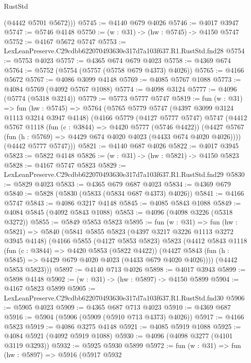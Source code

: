 \begin{lexlean}{RustStd}
\begin{coremodule}
        (@4442 @5701 @5672)))
@5745 := @4140 @679 @4026
@5746 := @4017 @3947
@5747 := @5746 @4148
@5750 := (w : @31) -> (hw : @5745) -> @4150 @5747
@5752 := @4167 @5672 @5747
@5753 := LexLeanPreserve.C29cdbb622070493630e317d7a103f637.R1.RustStd.fnd28
@5754 := @5753 @4023
@5757 := @4365 @674 @679 @4023
@5758 := @4369 @674
@5764 := @5752 (@5754 (@5757 (@5758 @679 @4373) @4026))
@5765 := @4166 @5672
@5767 := @4086 @3099 @4148
@5769 := @4085 @5767 @1088
@5773 := @4084 @5769 (@4092 @5767 @1088)
@5774 := @4098 @3124
@5777 := @4096 (@5774 (@5318 @3214))
@5779 := @5773 @5777 @5747
@5819 := fun (w : @31) =>
  fun (hw : @5745) =>
  @5764
    (@5765
      @5779
      @5747
      (@4397 @3099 @3124 @1113 @3214 @3947 @4148)
      (@4166
        @5779
        (@4127 @5777 @5747)
        @5747
        (@4412
          @5767
          @1118
          (fun (c : @3844) => @4420 @5777 (@5746 @4422))
          (@4427 @5767 (fun (h : @5769) => @4429 @674 @4020 @4023 (@4433 @674 @4020 @4026))))
        (@4442 @5777 @5747)))
@5821 := @4140 @687 @4026
@5822 := @4017 @3945
@5823 := @5822 @4148
@5826 := (w : @31) -> (hw : @5821) -> @4150 @5823
@5828 := @4167 @5747 @5823
@5829 := LexLeanPreserve.C29cdbb622070493630e317d7a103f637.R1.RustStd.fnd29
@5830 := @5829 @4023
@5833 := @4365 @679 @687 @4023
@5834 := @4369 @679
@5840 := @5828 (@5830 (@5833 (@5834 @687 @4373) @4026))
@5841 := @4166 @5747
@5843 := @4086 @3217 @4148
@5845 := @4085 @5843 @1088
@5849 := @4084 @5845 (@4092 @5843 @1088)
@5853 := @4096 (@4098 @3226 (@5318 @3272))
@5855 := @5849 @5853 @5823
@5895 := fun (w : @31) =>
  fun (hw : @5821) =>
  @5840
    (@5841
      @5855
      @5823
      (@4397 @3217 @3226 @1113 @3272 @3945 @4148)
      (@4166
        @5855
        (@4127 @5853 @5823)
        @5823
        (@4412
          @5843
          @1118
          (fun (c : @3844) => @4420 @5853 (@5822 @4422))
          (@4427 @5843 (fun (h : @5845) => @4429 @679 @4020 @4023 (@4433 @679 @4020 @4026))))
        (@4442 @5853 @5823)))
@5897 := @4140 @713 @4026
@5898 := @4017 @3943
@5899 := @5898 @4148
@5902 := (w : @31) -> (hw : @5897) -> @4150 @5899
@5904 := @4167 @5823 @5899
@5905 := LexLeanPreserve.C29cdbb622070493630e317d7a103f637.R1.RustStd.fnd30
@5906 := @5905 @4023
@5909 := @4365 @687 @713 @4023
@5910 := @4369 @687
@5916 := @5904 (@5906 (@5909 (@5910 @713 @4373) @4026))
@5917 := @4166 @5823
@5919 := @4086 @3275 @4148
@5921 := @4085 @5919 @1088
@5925 := @4084 @5921 (@4092 @5919 @1088)
@5930 := @4096 (@4098 @3277 (@4101 @3119 @3293))
@5932 := @5925 @5930 @5899
@5972 := fun (w : @31) =>
  fun (hw : @5897) =>
  @5916
    (@5917
      @5932

\end{coremodule}
\end{lexlean}
